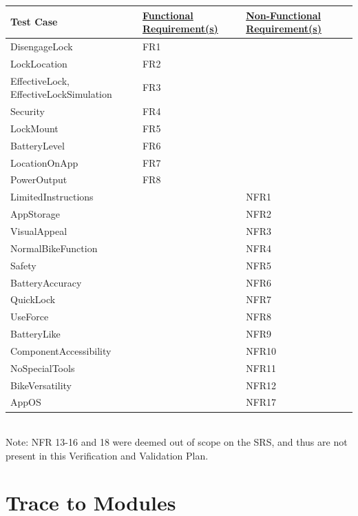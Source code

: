 \documentclass[12pt, titlepage]{article}
\begin{document}
\begin{minipage}{\textwidth}
\footnotesize
{}
\renewcommand*{\arraystretch}{1.5}
\begin{tabular}{| p{} | p{} | p{} |}
 \hline
 Test Case & \href{https://github.com/NevoAbigail/Capstone/blob/main/docs/SRS/SRS.pdf}{Functional Requirement(s)} & \href{https://github.com/NevoAbigail/Capstone/blob/main/docs/SRS/SRS.pdf}{Non-Functional Requirement(s)} \\ 
 \hline
 DisengageLock & FR1 &  \\ 
  \hline
 LockLocation & FR2 &  \\ 
  \hline
 EffectiveLock, EffectiveLockSimulation & FR3 &  \\ 
  \hline
 Security & FR4 &  \\ 
  \hline
 LockMount & FR5 &  \\ 
  \hline
 BatteryLevel & FR6 &  \\ 
  \hline
 LocationOnApp & FR7 &  \\ 
  \hline
 PowerOutput & FR8 &  \\ 
  \hline
 LimitedInstructions & & NFR1 \\
 \hline
  AppStorage & & NFR2 \\
 \hline
  VisualAppeal & & NFR3 \\
 \hline
  NormalBikeFunction & & NFR4 \\
 \hline
  Safety & & NFR5 \\
 \hline
  BatteryAccuracy & & NFR6 \\
 \hline
  QuickLock & & NFR7 \\
 \hline
 UseForce & & NFR8 \\
 \hline
 BatteryLike & & NFR9 \\
 \hline
  ComponentAccessibility & & NFR10 \\
 \hline
  NoSpecialTools & & NFR11 \\
 \hline
  BikeVersatility & & NFR12 \\
 \hline
  AppOS & & NFR17 \\
 \hline
 \end{tabular}
\end{minipage}\\

Note: NFR 13-16 and 18 were deemed out of scope on the SRS, and thus are not present in this Verification and Validation Plan. 
		
\section{Trace to Modules}	
\end{document}
